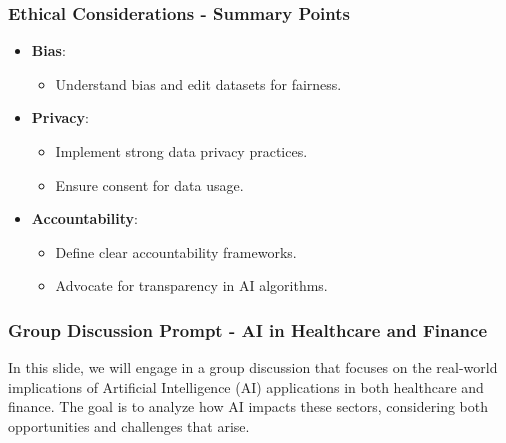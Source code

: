 \documentclass[aspectratio=169]{beamer}
\begin{document}
\begin{frame}[fragile]
    \frametitle{Ethical Considerations - Summary Points}
    \begin{itemize}
        \item \textbf{Bias}:
        \begin{itemize}
            \item Understand bias and edit datasets for fairness.
        \end{itemize}
        
        \item \textbf{Privacy}:
        \begin{itemize}
            \item Implement strong data privacy practices.
            \item Ensure consent for data usage.
        \end{itemize}
        
        \item \textbf{Accountability}:
        \begin{itemize}
            \item Define clear accountability frameworks.
            \item Advocate for transparency in AI algorithms.
        \end{itemize}
    \end{itemize}
\end{frame}

\begin{frame}[fragile]
    \frametitle{Group Discussion Prompt - AI in Healthcare and Finance}
    
    In this slide, we will engage in a group discussion that focuses on the real-world implications of Artificial Intelligence (AI) applications in both healthcare and finance. The goal is to analyze how AI impacts these sectors, considering both opportunities and challenges that arise.
\end{frame}
\end{document}
